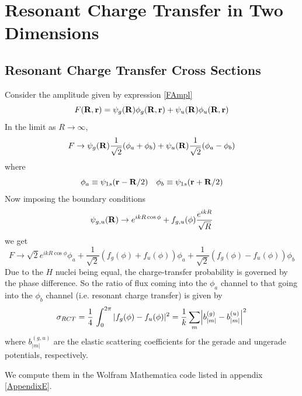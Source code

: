 \section{Resonant Charge Transfer in Two Dimensions}
\label{chap:RRP2}

\subsection{Resonant Charge Transfer Cross Sections}

Consider the amplitude given by expression \eqref{FAmpl}
\begin{equation}
F({\bf R},{\bf r}) = \psi_{g}({\bf R}) \phi_{g}({\bf R},{\bf r}) + \psi_{u}({\bf R}) \phi_{u}({\bf R},{\bf r})
\end{equation}
In the limit as $ R \rightarrow \infty$,
\begin{equation}
F \rightarrow \psi_{g}({\bf R}) \frac{1}{\sqrt{2}} (\phi_{a} + \phi_{b} ) +
\psi_{u}({\bf R}) \frac{1}{\sqrt{2}} (\phi_{a} - \phi_{b} )
\end{equation}
where
\begin{equation}
\phi_{a} \equiv \psi_{1s}({\bf r}-{\bf R}/2)
\quad \phi_{b} \equiv \psi_{1s}({\bf r}+{\bf R}/2)
\end{equation}
Now imposing the boundary conditions
\begin{equation}
\psi_{g,u}({\bf R}) \rightarrow
e^{i k R \cos\phi} + f_{g,u}(\phi) \frac{e^{i k R}}{\sqrt{R}}
\end{equation} 
we get
\begin{equation}
F \rightarrow \sqrt{2}e^{i k R \cos\phi}\phi_{a}
+ \frac{1}{\sqrt{2}} (f_{g}(\phi)+f_{u}(\phi))  \phi_{a}  + \frac{1}{\sqrt{2}} (f_{g}(\phi)-f_{u}(\phi))  \phi_{b}
\end{equation} 
Due to the $ H $ nuclei being equal, the charge-transfer probability is governed by the phase difference. 
So the ratio of flux coming into the $\phi_{a}$ channel to that going into the $\phi_{b} $ channel (i.e. resonant charge transfer) is given by
\begin{equation}
\sigma_{RCT}= \frac{1}{4} \, \int_{0}^{2 \pi} |f_{g}(\phi)-f_{u}(\phi) |^2 = \frac{1}{k} \sum_{m} \Bigl |b^{(g)}_{|m|} - b^{(u)}_{|m|} \Bigr |^2
\end{equation}
where $ b^{(g,u)}_{|m|} $ are the elastic
scattering coefficients for the gerade and ungerade potentials, respectively.

We compute them in the Wolfram Mathematica code listed in appendix \ref{AppendixE}.

